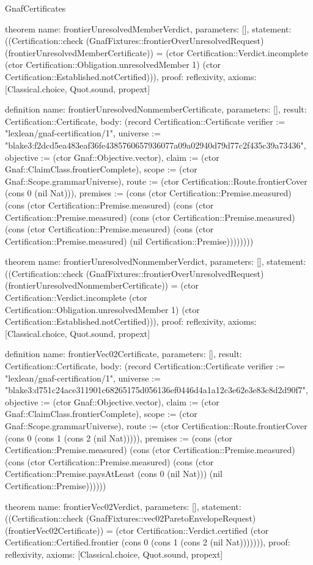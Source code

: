 \begin{lexlean}{GnafCertificates}
\begin{semanticmodule}
theorem{
  name: frontierUnresolvedMemberVerdict,
  parameters: [],
  statement: ((Certification::check (GnafFixtures::frontierOverUnresolvedRequest) (frontierUnresolvedMemberCertificate)) = (ctor Certification::Verdict.incomplete (ctor Certification::Obligation.unresolvedMember 1) (ctor Certification::Established.notCertified))),
  proof: reflexivity{},
  axioms: [Classical.choice, Quot.sound, propext]
}

definition{
  name: frontierUnresolvedNonmemberCertificate,
  parameters: [],
  result: Certification::Certificate,
  body: (record Certification::Certificate {verifier := "lexlean/gnaf-certification/1", universe := "blake3:f2dcd5ea483eaf36fe4385760657936077a09a02940d79d77c2f435c39a73436", objective := (ctor Gnaf::Objective.vector), claim := (ctor Gnaf::ClaimClass.frontierComplete), scope := (ctor Gnaf::Scope.grammarUniverse), route := (ctor Certification::Route.frontierCover (cons 0 (nil Nat))), premises := (cons (ctor Certification::Premise.measured) (cons (ctor Certification::Premise.measured) (cons (ctor Certification::Premise.measured) (cons (ctor Certification::Premise.measured) (cons (ctor Certification::Premise.measured) (cons (ctor Certification::Premise.measured) (nil Certification::Premise)))))))})
}

theorem{
  name: frontierUnresolvedNonmemberVerdict,
  parameters: [],
  statement: ((Certification::check (GnafFixtures::frontierOverUnresolvedRequest) (frontierUnresolvedNonmemberCertificate)) = (ctor Certification::Verdict.incomplete (ctor Certification::Obligation.unresolvedMember 1) (ctor Certification::Established.notCertified))),
  proof: reflexivity{},
  axioms: [Classical.choice, Quot.sound, propext]
}

definition{
  name: frontierVec02Certificate,
  parameters: [],
  result: Certification::Certificate,
  body: (record Certification::Certificate {verifier := "lexlean/gnaf-certification/1", universe := "blake3:d751c24ace311901c68265175d056136ef0446d4a1a12c3e62e3e83c8d2d90f7", objective := (ctor Gnaf::Objective.vector), claim := (ctor Gnaf::ClaimClass.frontierComplete), scope := (ctor Gnaf::Scope.grammarUniverse), route := (ctor Certification::Route.frontierCover (cons 0 (cons 1 (cons 2 (nil Nat))))), premises := (cons (ctor Certification::Premise.measured) (cons (ctor Certification::Premise.measured) (cons (ctor Certification::Premise.measured) (cons (ctor Certification::Premise.paysAtLeast (cons 0 (nil Nat))) (nil Certification::Premise)))))})
}

theorem{
  name: frontierVec02Verdict,
  parameters: [],
  statement: ((Certification::check (GnafFixtures::vec02ParetoEnvelopeRequest) (frontierVec02Certificate)) = (ctor Certification::Verdict.certified (ctor Certification::Certified.frontier (cons 0 (cons 1 (cons 2 (nil Nat))))))),
  proof: reflexivity{},
  axioms: [Classical.choice, Quot.sound, propext]
}


\end{semanticmodule}
\end{lexlean}
